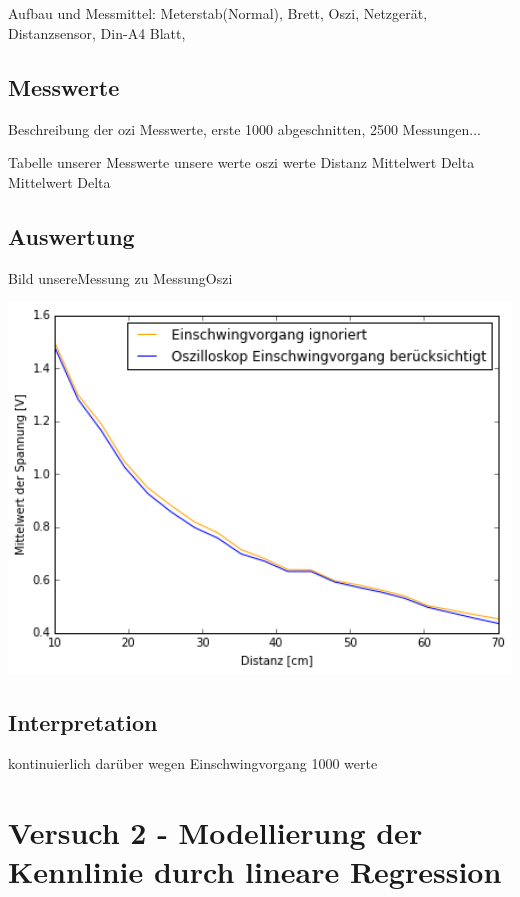 \documentclass[12pt,oneside,a4paper]{report}
\begin{document}
\paragraph{} Aufbau und Messmittel: Meterstab(Normal), Brett, Oszi, Netzgerät, Distanzsensor, Din-A4 Blatt,

\section{Messwerte}
\label{chap:VERSUCH_1_MESSWERTE}

Beschreibung der ozi Messwerte, erste 1000 abgeschnitten, 2500 Messungen...

Tabelle unserer Messwerte
         unsere werte           oszi werte
Distanz Mittelwert Delta   Mittelwert Delta

\section{Auswertung}
\label{chap:VERSUCH_1_AUSWERTUNG}
 Bild unsereMessung zu MessungOszi

\includegraphics[width = 18.00cm]{src/Diagramm1.png}	

\section{Interpretation}
\label{chap:VERSUCH_1_INTERPRETATION}
kontinuierlich darüber wegen Einschwingvorgang 1000 werte


%
%
\chapter{Versuch 2 - Modellierung der Kennlinie durch lineare Regression}
\label{chap:VERSUCH_2}
\end{document}
